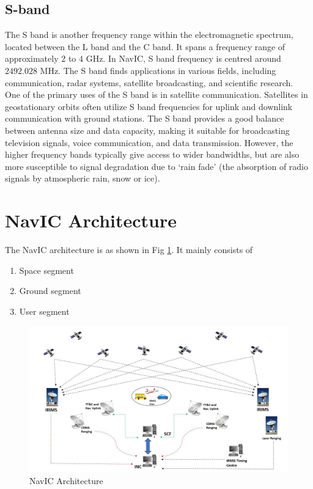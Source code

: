 \subsection{S-band} 
The S band is another frequency range within the electromagnetic spectrum, located between the L band and the C band. It spans a frequency range of approximately $2$ to $4$ GHz. In NavIC, S band frequency is centred around $2492.028$ MHz. The S band finds applications in various fields, including communication, radar systems, satellite broadcasting, and scientific research.
\\
One of the primary uses of the S band is in satellite communication. Satellites in geostationary orbits often utilize S band frequencies for uplink and downlink communication with ground stations. The S band provides a good balance between antenna size and data capacity, making it suitable for broadcasting television signals, voice communication, and data transmission. However, the higher frequency bands typically give access to wider bandwidths, but are also more susceptible to signal degradation due to ‘rain fade’ (the absorption of radio signals by atmospheric rain, snow or ice).

\section{NavIC Architecture}	
The NavIC architecture is as shown in Fig \ref{figs:archfig}. It mainly consists of 
\begin{enumerate}
	\item Space segment 
	\item Ground segment 
	\item User segment 
\end{enumerate}

	\begin{figure}[!ht]
	\centering
	\includegraphics[width=\columnwidth]{figs/Architecture.jpg}
	\caption{NavIC Architecture}
	\label{figs:archfig}
	\end{figure}

